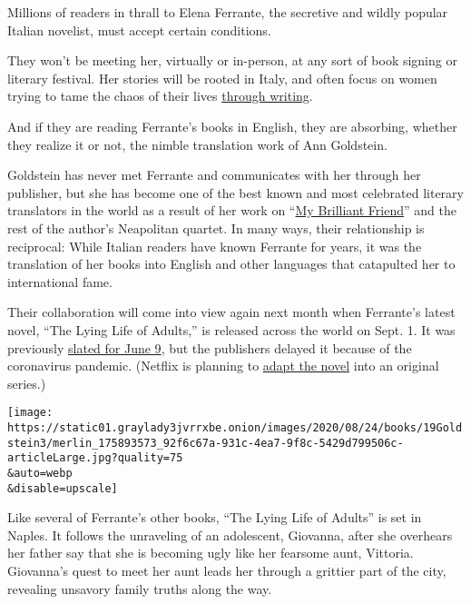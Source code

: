 Millions of readers in thrall to Elena Ferrante, the secretive and
wildly popular Italian novelist, must accept certain conditions.

They won't be meeting her, virtually or in-person, at any sort of book
signing or literary festival. Her stories will be rooted in Italy, and
often focus on women trying to tame the chaos of their lives
\href{https://www.nytimes3xbfgragh.onion/2019/05/17/opinion/elena-ferrante-on-women-power.html}{through
writing}.

And if they are reading Ferrante's books in English, they are absorbing,
whether they realize it or not, the nimble translation work of Ann
Goldstein.

Goldstein has never met Ferrante and communicates with her through her
publisher, but she has become one of the best known and most celebrated
literary translators in the world as a result of her work on
``\href{https://www.nytimes3xbfgragh.onion/2012/12/23/books/review/my-brilliant-friend-by-elena-ferrante-and-more.html}{My
Brilliant Friend}'' and the rest of the author's Neapolitan quartet. In
many ways, their relationship is reciprocal: While Italian readers have
known Ferrante for years, it was the translation of her books into
English and other languages that catapulted her to international fame.

Their collaboration will come into view again next month when Ferrante's
latest novel, ``The Lying Life of Adults,'' is released across the world
on Sept. 1. It was previously
\href{https://www.nytimes3xbfgragh.onion/2019/10/28/books/elena-ferrante-lying-life-adults-brilliant-friend.html}{slated
for June 9}, but the publishers delayed it because of the coronavirus
pandemic. (Netflix is planning to
\href{https://media.netflix.com/en/press-releases/the-lying-life-of-adults-elena-ferrantes-latest-novel-will-be-developed-into-a-netflix-original-series-together-with-fandango}{adapt
the novel} into an original series.)

\texttt{[image: https://static01.graylady3jvrrxbe.onion/images/2020/08/24/books/19Goldstein3/merlin\_175893573\_92f6c67a-931c-4ea7-9f8c-5429d799506c-articleLarge.jpg?quality=75\\\&auto=webp\\\&disable=upscale]}

Like several of Ferrante's other books, ``The Lying Life of Adults'' is
set in Naples. It follows the unraveling of an adolescent, Giovanna,
after she overhears her father say that she is becoming ugly like her
fearsome aunt, Vittoria. Giovanna's quest to meet her aunt leads her
through a grittier part of the city, revealing unsavory family truths
along the way.

